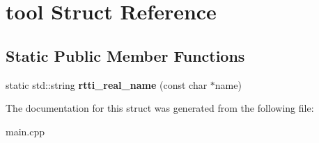 \hypertarget{structtool}{\section{tool \-Struct \-Reference}
\label{structtool}
}
\subsection*{\-Static \-Public \-Member \-Functions}
\begin{DoxyCompactItemize}
\item 
\hypertarget{structtool_a4d7c73cebcdb1f0ed2d1441f6bdeed24}{static std\-::string {\bfseries rtti\-\_\-real\-\_\-name} (const char $\ast$name)}\label{structtool_a4d7c73cebcdb1f0ed2d1441f6bdeed24}

\end{DoxyCompactItemize}


\-The documentation for this struct was generated from the following file\-:\begin{DoxyCompactItemize}
\item 
main.\-cpp\end{DoxyCompactItemize}
